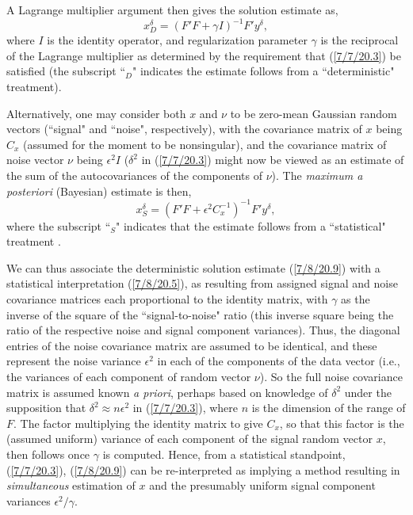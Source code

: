 \documentclass{amsart}
\numberwithin{equation}{section}
\theoremstyle{definition}
\numberwithin{theorem}{section}
\begin{document}
  A Lagrange multiplier argument then gives the solution estimate as, \begin{equation}\label{7/8/20.9} x^\delta_D = (F'F + \gamma I)^{-1}F'y^\delta,\end{equation} where $I$ is the identity operator, and regularization parameter $\gamma$ is the reciprocal of the
   Lagrange multiplier as determined by the requirement that (\ref{7/7/20.3}) be satisfied (the subscript ``$_D$" indicates the estimate follows from a ``deterministic" treatment).  
 
 Alternatively, one may consider both $x$ and $\nu$ to be zero-mean Gaussian random vectors (``signal" and ``noise", respectively), with the covariance matrix of $x$ being $C_x$ (assumed for the moment to be nonsingular), and the covariance matrix of noise vector $\nu$ being $\epsilon^2 I$ ($\delta^2$ in (\ref{7/7/20.3}) might now be viewed as an estimate of the sum of the autocovariances of the components of $\nu$).  The {\it maximum  a posteriori} (Bayesian) estimate  is then, \begin{equation}\label{7/8/20.5} x^\delta_S = (F'F + \epsilon^2 C_x^{-1})^{-1} F'y^\delta,\end{equation}  where the subscript ``$_S$" indicates that the estimate follows from  a ``statistical" treatment \cite{vogel:2002}. 
  
 We can thus associate the deterministic solution estimate (\ref{7/8/20.9}) with a statistical interpretation (\ref{7/8/20.5}), as resulting from assigned signal and noise covariance matrices each proportional to the identity matrix, with $\gamma$ as the inverse of the square of the  ``signal-to-noise" ratio (this inverse square being the ratio of the respective noise and signal component variances).  Thus, the diagonal entries of the noise covariance matrix are assumed to be identical, and these represent the noise variance $\epsilon^2$ in each of the components of the data vector (i.e., the variances of each component of random vector $\nu$).   So the full noise covariance matrix is assumed known {\it a priori}, perhaps based on knowledge of $\delta^2$ under the supposition that $\delta^2 \approx n\epsilon^2$ in (\ref{7/7/20.3}), where $n$ is the dimension of the range of $F$.  The factor multiplying the identity matrix to give $C_x$, so that this factor is the (assumed uniform) variance of each component of the signal random vector $x$, then follows once $\gamma$ is computed.  Hence, from a statistical standpoint,  (\ref{7/7/20.3}), (\ref{7/8/20.9}) can be re-interpreted as implying a method resulting in {\it simultaneous} estimation of $x$ and the presumably uniform signal component variances $\epsilon^2/\gamma$. 
 
\end{document}
